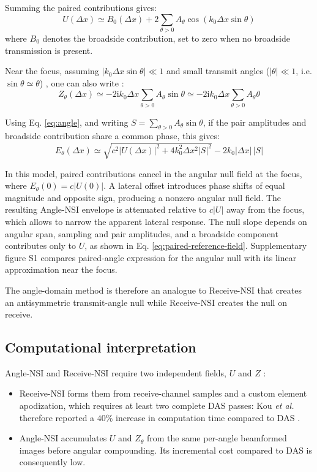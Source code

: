 \documentclass{iopjournal}
\providecommand{\revstart}{}
\providecommand{\revstop}{}
\begin{document}
Summing the paired contributions gives:
\begin{equation}
U(\Delta x)\simeq B_0(\Delta x)
+2\sum_{\theta>0}A_\theta\cos(k_0\Delta x\sin\theta)
\label{eq:paired-reference-field}
\end{equation}
where $B_0$ denotes the broadside contribution, set to zero
when no broadside transmission is present.

Near the focus, assuming $|k_0\Delta x\sin\theta|\ll1$ and small transmit angles ($|\theta|\ll1$, i.e. $\sin\theta\simeq\theta$) , one can also write :
\begin{equation}
Z_\theta(\Delta x)\simeq
-2\mathrm{i}k_0\Delta x\sum_{\theta>0}A_\theta\sin\theta \simeq
-2\mathrm{i}k_0\Delta x\sum_{\theta>0}A_\theta\theta
\label{eq:small-angle}
\end{equation}

Using Eq. \eqref{eq:angle}, and writing $S=\sum_{\theta>0}A_\theta\sin\theta$, if the pair amplitudes and broadside contribution share a common phase, this gives:
\begin{equation}
E_\theta(\Delta x)\simeq
\sqrt{c^2|U(\Delta x)|^2+4k_0^2\Delta x^2|S|^2}
-2k_0|\Delta x|\,|S|
\label{eq:angle-local-psf-common-phase}
\end{equation}

In this model, paired contributions cancel in the angular null field at the focus, where $E_\theta(0)=c|U(0)|$. A lateral offset introduces phase shifts of equal magnitude and opposite sign, producing a nonzero angular null field. The resulting Angle-NSI envelope is attenuated relative to $c|U|$ away from the focus, which allows to narrow the apparent lateral response. The null slope depends on angular span, sampling and pair amplitudes, and a broadside component contributes only to \(U\), as shown in Eq. \eqref{eq:paired-reference-field}. Supplementary figure S1 compares paired-angle expression for the angular null with its linear approximation near the focus. \revstop

The angle-domain method is therefore an analogue to \revstart Receive-NSI \revstop that
creates an antisymmetric transmit-angle null while \revstart Receive-NSI\revstop{}
creates the null on receive. 

\subsection{Computational interpretation}

\revstart Angle-NSI and Receive-NSI require two independent
fields, $U$ and $Z$ : 
\begin{itemize}
    \item Receive-NSI forms them from receive-channel samples and a
custom element apodization, which requires at least two complete DAS passes: Kou \textit{et al.} therefore reported a $40\%$ increase in computation time compared to DAS \citep{kou2024highresolution}.
    \item Angle-NSI accumulates $U$ and
$Z_\theta$ from the same per-angle beamformed images before angular compounding. Its incremental cost compared to DAS is consequently low.\revstop
\end{itemize} 
\end{document}
